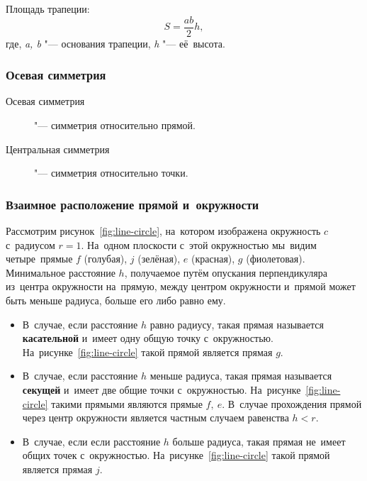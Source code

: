 \documentclass[]{scrartcl}
\begin{document}
Площадь трапеции:
\begin{equation}\label{eq:parallelogram-square}
S=\frac{ab}{2}h,
\end{equation}
где, \textit{a, b} "--- основания трапеции, \textit{h} "--- её~высота.


\subsubsection{Осевая симметрия}
\begin{description}
	\item[Осевая симметрия] "--- симметрия относительно прямой.
\end{description}

\begin{description}
	\item[Центральная симметрия] "--- симметрия относительно точки.
\end{description} 

\subsubsection{Взаимное расположение прямой и~окружности}
Рассмотрим рисунок~\ref{fig:line-circle}, на~котором изображена окружность ${\textstyle c}$ с~радиусом ${\textstyle r=1}$. На~одном плоскости с~этой окружностью мы~видим четыре~прямые ${\textstyle f}$ (голубая), ${\textstyle j}$ (зелёная), ${\textstyle e}$ (красная), ${\textstyle g}$ (фиолетовая). Минимальное расстояние ${\textstyle h}$, получаемое путём опускания перпендикуляра из~центра окружности на~прямую, между центром окружности и~прямой может быть меньше радиуса, больше его либо равно ему. 
\begin{itemize}
	\item В~случае, если расстояние ${\textstyle h}$ равно радиусу, такая прямая называется \textbf{касательной} и~имеет одну общую точку с~окружностью. На~рисунке~\ref{fig:line-circle} такой прямой является прямая ${\textstyle g}$.
	\item В~случае, если расстояние ${\textstyle h}$ меньше радиуса, такая прямая называется \textbf{секущей} и~имеет две общие точки с~окружностью. На~рисунке~\ref{fig:line-circle} такими прямыми являются прямые ${\textstyle f,\ e}$. В~случае прохождения прямой через центр окружности является частным случаем равенства ${\textstyle h < r}$.
	\item В~случае, если если расстояние ${\textstyle h}$ больше радиуса, такая прямая не~имеет общих точек с~окружностью. На~рисунке~\ref{fig:line-circle} такой прямой является прямая ${\textstyle j}$.
\end{itemize}
\end{document}
